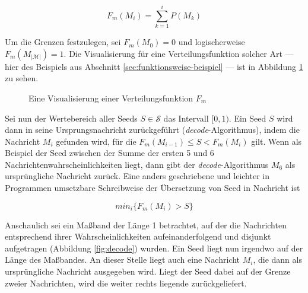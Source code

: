 $$F_m(M_i) = \sum_{k = 1}^{i} P(M_k)$$

Um die Grenzen festzulegen, sei $F_m(M_0) = 0$ und logischerweise $F_m(M_{|\mathcal{M}|}) = 1$. Die Visualisierung für eine Verteilungsfunktion solcher Art --- hier des Beispiels aus Abschnitt \ref{sec:funktionsweise-beispiel} --- ist in Abbildung \ref{fig:Verteilungsfunktion} zu sehen.

\begin{figure}[!h]
\center
{}
\caption{Eine Visualisierung einer Verteilungsfunktion $F_m$}
\label{fig:Verteilungsfunktion}
\end{figure}

Sei nun der Wertebereich aller Seeds $S \in \mathcal{S}$ das Intervall $[0,1)$. Ein Seed $S$ wird dann in seine Ursprungsnachricht zurückgeführt (\emph{decode}-Algorithmus), indem die Nachricht $M_i$ gefunden wird, für die $F_m(M_{i-1}) \leq S < F_m(M_i)$ gilt. Wenn als Beispiel der Seed zwischen der Summe der ersten 5 und 6 Nachrichtenwahrscheinlichkeiten liegt, dann gibt der \emph{decode}-Algorithmus $M_6$ als ursprüngliche Nachricht zurück. Eine anders geschriebene und leichter in Programmen umsetzbare Schreibweise der Übersetzung von Seed in Nachricht ist

$$min_i\{F_m(M_i) > S\}$$

Anschaulich sei ein Maßband der Länge 1 betrachtet, auf der die Nachrichten entsprechend ihrer Wahrscheinlichkeiten aufeinanderfolgend und disjunkt aufgetragen (Abbildung \ref{fig:decode}) wurden. Ein Seed liegt nun irgendwo auf der Länge des Maßbandes. An dieser Stelle liegt auch eine Nachricht $M_i$, die dann als ursprüngliche Nachricht ausgegeben wird. Liegt der Seed dabei auf der Grenze zweier Nachrichten, wird die weiter rechts liegende zurückgeliefert.

